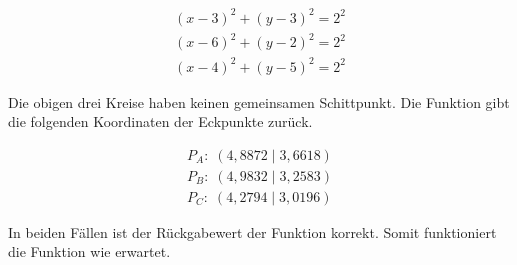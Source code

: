 \begin{equation*}
\label{eq:unit_test_positionsbestimmung}
\begin{split}
(x - 3)^{2} + (y - 3)^{2} = 2^{2} \\
(x - 6)^{2} + (y - 2)^{2} = 2^{2} \\
(x - 4)^{2} + (y - 5)^{2} = 2^{2}
\end{split}
\end{equation*}

Die obigen drei Kreise haben keinen gemeinsamen Schittpunkt. Die Funktion gibt die folgenden Koordinaten der Eckpunkte zurück.

\begin{equation*}
\label{eq:unit_test_positionsbestimmung_2}
\begin{split}
P_{A}: \; (4,8872 \;|\; 3,6618)\\
P_{B}: \; (4,9832 \;|\; 3,2583)\\
P_{C}: \; (4,2794 \;|\; 3,0196)
\end{split}
\end{equation*}

In beiden Fällen ist der Rückgabewert der Funktion korrekt. Somit funktioniert die Funktion wie erwartet.






